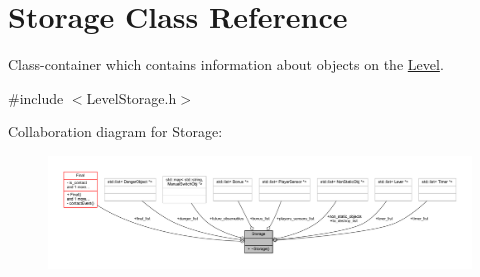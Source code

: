 \hypertarget{class_storage}{}\section{Storage Class Reference}
\label{class_storage}


Class-\/container which contains information about objects on the \hyperlink{class_level}{Level}.  




{\ttfamily \#include $<$Level\+Storage.\+h$>$}



Collaboration diagram for Storage\+:\nopagebreak
\begin{figure}[H]
\begin{center}
\leavevmode
\includegraphics[width=350pt]{class_storage__coll__graph}
\end{center}
\end{figure}
